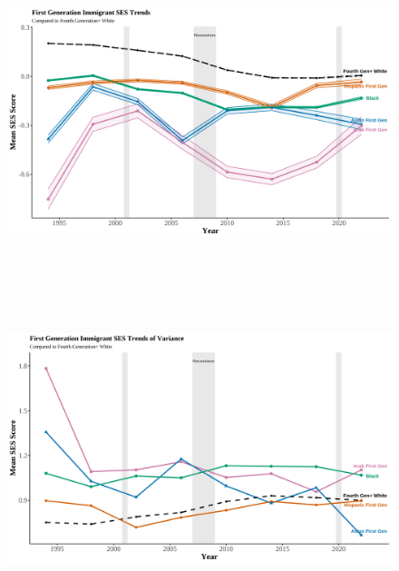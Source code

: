 \begin{center}
    \begin{figure}[H]
    \caption{}
    \includegraphics[width=\textwidth, height=9cm]{figure/04-SES-firstgens.png} 
    \label{fig:diag}
    \caption*{\footnotesize{}}
    \end{figure}
    \hfill%
\end{center}

\clearpage

\begin{center}
    \begin{figure}[H]
    \caption{}
    \includegraphics[width=\textwidth, height=9cm]{figure/08-var-SES-firstgens.png} 
    \label{fig:diag}
    \caption*{\footnotesize{}}
    \end{figure}
    \hfill%
\end{center}


